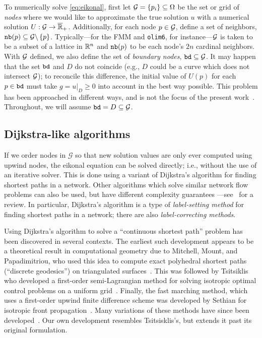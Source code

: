 \documentclass[eikonal.tex]{subfiles}
\begin{document}
To numerically solve \cref{eq:eikonal}, first let
$\mathcal{G} = \{p_i\} \subseteq \Omega$ be the set or grid of \emph{nodes}
where we would like to approximate the true solution $u$ with a
numerical solution $U : \mathcal{G} \to
\overline{\mathbb{R}}_+$. Additionally, for each node $p \in \mathcal{G}$,
define a set of neighbors,
$\texttt{nb}(p) \subseteq \mathcal{G} \backslash \left\{p\right\}$. Typically---for the FMM
and \texttt{olim6}, for instance---$\mathcal{G}$ is taken to be a subset of
a lattice in $\mathbb{R}^n$ and $\texttt{nb}(p)$ to be each node's $2n$ cardinal
neighbors. With $\mathcal{G}$ defined, we also define the set of
\emph{boundary nodes}, $\texttt{bd} \subseteq \mathcal{G}$. It may happen that
the set $\texttt{bd}$ and $D$ do not coincide (e.g., $D$ could be a
curve which does not intersect $\mathcal{G}$); to reconcile this difference,
the initial value of $U(p)$ for each $p \in \texttt{bd}$ must take
$g = \left. u \right|_D \geq 0$ into account in the best way
possible. This problem has been approached in different ways, and is
not the focus of the present work~\cite{chopp2001some}. Throughout, we
will assume $\texttt{bd} = D \subseteq \mathcal{G}$.

\subsection{Dijkstra-like algorithms}\label{ssec:dijkstra-like}
If we order nodes in $\mathcal{G}$ so that new solution values are
only ever computed using upwind nodes, the eikonal equation can be
solved directly; i.e., without the use of an iterative solver. This is
done using a variant of Dijkstra's algorithm for finding shortest
paths in a network. Other algorithms which solve similar network flow
problems can also be used, but have different complexity guarantees
---see~\cite{chacon2012fast} for a review. In particular, Dijkstra's
algorithm is a type of \emph{label-setting method} for finding
shortest paths in a network; there are also \emph{label-correcting
  methods}.

Using Dijkstra's algorithm to solve a ``continuous shortest path''
problem has been discovered in several contexts. The earliest such
development appears to be a theoretical result in computational
geometry due to Mitchell, Mount, and Papadimitriou, who used this idea
to compute exact polyhedral shortest paths (``discrete geodesics'') on
triangulated surfaces~\cite{mitchell1987discrete}. This was followed
by Tsitsiklis who developed a first-order semi-Lagrangian method for
solving isotropic optimal control problems on a uniform
grid~\cite{tsitsiklis1995efficient}. Finally, the fast marching
method, which uses a first-order upwind finite difference scheme was
developed by Sethian for isotropic front
propagation~\cite{sethian1996fast}. Many variations of these methods
have since been developed~\cite{sethian2003ordered,kao2004lax}. Our
own development resembles Tsitsisklis's, but extends it past its
original formulation.
\end{document}
